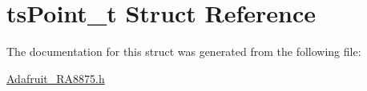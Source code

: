 \hypertarget{structts_point__t}{}\section{ts\+Point\+\_\+t Struct Reference}
\label{structts_point__t}


The documentation for this struct was generated from the following file\+:\begin{DoxyCompactItemize}
\item 
\mbox{\hyperlink{_adafruit___r_a8875_8h}{Adafruit\+\_\+\+R\+A8875.\+h}}\end{DoxyCompactItemize}
